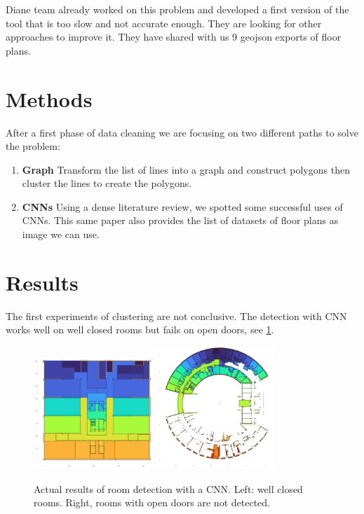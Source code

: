 \documentclass[11pt]{article}
\begin{document}
Diane team already worked on this problem and developed a first version of the tool
that is too slow and not accurate enough. They are looking for other approaches
to improve it. They have shared with us 9 geojson exports of floor plans.

\section{Methods}
\label{sec:methods}
After a first phase of data cleaning we are focusing on two different paths to solve the problem:

\begin{enumerate}
    \item \textbf{Graph} Transform the list of lines into a graph and construct polygons \cite{Schafer2011AutomaticGO} then cluster the lines to create the polygons\cite{dominguez2012Semiautomaticdetection}.
    \item \textbf{CNNs} Using a dense literature review\cite{PIZARRO2022104348}, we 
    spotted some successful uses of CNNs\cite{ijgi10020097}. This same paper also provides the list
    of datasets of floor plans as image we can use.
\end{enumerate}

\section{Results}
The first experiments of clustering are not conclusive. The detection with 
CNN works well on well closed rooms but fails on open doors, see \cref{fig:CNN_results}.

\begin{figure}[htb!]
    \centering
    \includegraphics[width=0.4\textwidth]{figures/output4_CNN.png}
    \includegraphics[width=0.4\textwidth]{figures/output7_CNN.png}
    \caption{Actual results of room detection with a CNN. Left: well closed rooms. Right, rooms with open doors are not detected.}
    \label{fig:CNN_results}
\end{figure}
\end{document}
